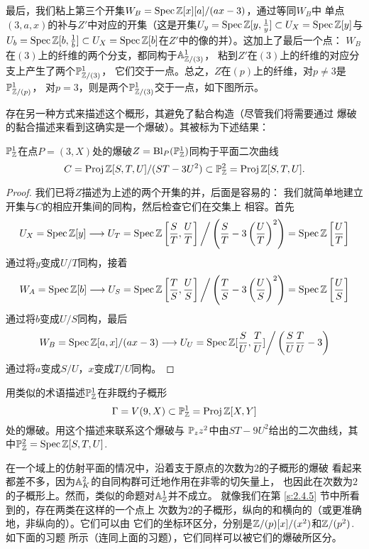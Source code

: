 最后，我们粘上第三个开集$W_B=\spec \zz[x][a]/(ax-3)$，通过等同$W_B$中
单点$(3,a,x)$的补与$Z'$中对应的开集（这是开集$U_y=\spec \zz[y,\frac 1y]
\subset U_X=\spec \zz[y]$与$U_b=\spec \zz[b,\frac 1b]
\subset U_X=\spec \zz[b]$在$Z'$中的像的并）。这加上了最后一个点：
$W_B$在$(3)$上的纤维的两个分支，都同构于$\A_{\zz/(3)}^1$，
粘到$Z'$在$(3)$上的纤维的对应分支上产生了两个$\P_{\zz/(3)}^1$，
它们交于一点。总之，$Z$在$(p)$上的纤维，对$p\neq 3$是$\P_{\zz/(p)}^1$，
对$p=3$，则是两个$\P_{\zz/(3)}^1$交于一点，如下图所示。

存在另一种方式来描述这个概形，其避免了黏合构造（尽管我们将需要通过
爆破的黏合描述来看到这确实是一个爆破）。其被标为下述结果：

\begin{pro}\label{pro:4.47}
$\P_\zz^1$在点$P=(3,X)$处的爆破$Z=\Bl_P(\P_\zz^1)$同构于平面二次曲线
\[
	C=\proj \zz[S,T,U]/(ST-3U^2)\subset \mathbb P_\zz^2=\proj \zz[S,T,U].
\]
\end{pro}


\begin{proof}
我们已将$Z$描述为上述的两个开集的并，后面是容易的：
我们就简单地建立开集与$C$的相应开集间的同构，然后检查它们在交集上
相容。首先
\[
	U_X=\spec \zz[y]\longrightarrow U_T=\spec \zz \left[\frac ST,\frac UT\right]\bigg / \left(\frac ST-3\left(\frac UT\right)^2\right)=\spec \zz \left[\frac UT\right]
\]
通过将$y$变成$U/T$同构，接着
\[
	W_A=\spec \zz[b]\longrightarrow U_S=\spec \zz \left[\frac TS,\frac US\right]\bigg / \left(\frac TS-3\left(\frac US\right)^2\right)=\spec \zz \left[\frac US\right]
\]
通过将$b$变成$U/S$同构，最后
\[
	W_B=\spec \zz[a,x]/(ax-3)\longrightarrow U_U=\spec \zz[\frac SU,\frac TU]\bigg / \left(\frac SU \frac TU-3\right)
\]
通过将$a$变成$S/U$，$x$变成$T/U$同构。
\end{proof}

\begin{exe}\label{exe:4.48}
用类似的术语描述$\P_\zz^1$在非既约子概形
\[
	\Gamma = V(9,X)\subset \mathbb P_\zz^1=\proj \zz[X,Y]
\]
处的爆破。用这个描述来联系这个爆破与
$\P_zz^2$中由$ST-9U^2$给出的二次曲线，其中$\P_\zz^2=\spec \zz[S,T,U]$.
\end{exe}

在一个域上的仿射平面的情况中，沿着支于原点的次数为$2$的子概形的爆破
看起来都差不多，因为$\A_K^2$的自同构群可迁地作用在非零的切矢量上，
也因此在次数为$2$的子概形上。然而，类似的命题对$\A_\zz^1$并不成立。
就像我们在第 \ref{s:2.4.5} 节中所看到的，存在两类在这样的一个点上
次数为$2$的子概形，纵向的和横向的（或更准确地，非纵向的）。它们可以由
它们的坐标环区分，分别是$\zz/(p)[x]/(x^2)$和$\zz/(p^2)$. 如下面的习题
所示（连同上面的习题），它们同样可以被它们的爆破所区分。

